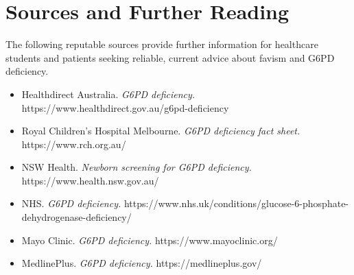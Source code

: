 \section*{Sources and Further Reading}
The following reputable sources provide further information for healthcare students and patients seeking reliable, current advice about favism and G6PD deficiency.
\begin{itemize}
    \item Healthdirect Australia. \textit{G6PD deficiency.} https://www.healthdirect.gov.au/g6pd-deficiency
    \item Royal Children's Hospital Melbourne. \textit{G6PD deficiency fact sheet.} https://www.rch.org.au/
    \item NSW Health. \textit{Newborn screening for G6PD deficiency.} https://www.health.nsw.gov.au/
    \item NHS. \textit{G6PD deficiency.} https://www.nhs.uk/conditions/glucose-6-phosphate-dehydrogenase-deficiency/
    \item Mayo Clinic. \textit{G6PD deficiency.} https://www.mayoclinic.org/
    \item MedlinePlus. \textit{G6PD deficiency.} https://medlineplus.gov/
\end{itemize}
